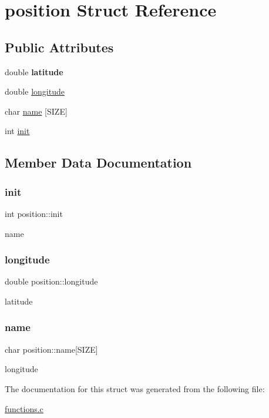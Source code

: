 \hypertarget{structposition}{}\section{position Struct Reference}
\label{structposition}
\subsection*{Public Attributes}
\begin{DoxyCompactItemize}
\item 
\mbox{\label{structposition_a404919ee74fdde1e31595d7a10b2d4bb}} 
double {\bfseries latitude}
\item 
double \hyperlink{structposition_a55b58f82e895e0d5746374125ee83c71}{longitude}
\item 
char \hyperlink{structposition_a87f1e728620908efb09dcf9b1feca092}{name} \mbox{[}S\+I\+ZE\mbox{]}
\item 
int \hyperlink{structposition_a9836cfdd2d2c1bec27b264b0670c1419}{init}
\end{DoxyCompactItemize}


\subsection{Member Data Documentation}
\mbox{\label{structposition_a9836cfdd2d2c1bec27b264b0670c1419}} 
\subsubsection{\texorpdfstring{init}{init}}
{\footnotesize\ttfamily int position\+::init}

name \mbox{\label{structposition_a55b58f82e895e0d5746374125ee83c71}} 
\subsubsection{\texorpdfstring{longitude}{longitude}}
{\footnotesize\ttfamily double position\+::longitude}

latitude \mbox{\label{structposition_a87f1e728620908efb09dcf9b1feca092}} 
\subsubsection{\texorpdfstring{name}{name}}
{\footnotesize\ttfamily char position\+::name\mbox{[}S\+I\+ZE\mbox{]}}

longitude 

The documentation for this struct was generated from the following file\+:\begin{DoxyCompactItemize}
\item 
\hyperlink{functions_8c}{functions.\+c}\end{DoxyCompactItemize}

